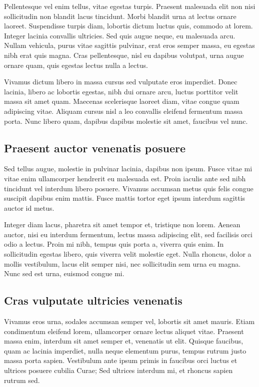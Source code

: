 Pellentesque vel enim tellus, vitae egestas turpis. Praesent malesuada elit
non nisi sollicitudin non blandit lacus tincidunt. Morbi blandit urna at
lectus ornare laoreet. Suspendisse turpis diam, lobortis dictum luctus
quis, commodo at lorem. Integer lacinia convallis ultricies. Sed quis augue
neque, eu malesuada arcu. Nullam vehicula, purus vitae sagittis pulvinar,
erat eros semper massa, eu egestas nibh erat quis magna. Cras pellentesque,
nisl eu dapibus volutpat, urna augue ornare quam, quis egestas lectus nulla
a lectus.

Vivamus dictum libero in massa cursus sed vulputate eros imperdiet. Donec
lacinia, libero ac lobortis egestas, nibh dui ornare arcu, luctus porttitor
velit massa sit amet quam. Maecenas scelerisque laoreet diam, vitae congue
quam adipiscing vitae. Aliquam cursus nisl a leo convallis eleifend
fermentum massa porta. Nunc libero quam, dapibus dapibus molestie sit amet,
faucibus vel nunc.

\subsection{Praesent auctor venenatis posuere}
Sed tellus augue, molestie in pulvinar lacinia, dapibus non ipsum. Fusce
vitae mi vitae enim ullamcorper hendrerit eu malesuada est. Proin iaculis
ante sed nibh tincidunt vel interdum libero posuere. Vivamus accumsan metus
quis felis congue suscipit dapibus enim mattis. Fusce mattis tortor eget
ipsum interdum sagittis auctor id metus.

Integer diam lacus, pharetra sit amet tempor et, tristique non lorem.
Aenean auctor, nisi eu interdum fermentum, lectus massa adipiscing elit,
sed facilisis orci odio a lectus. Proin mi nibh, tempus quis porta a,
viverra quis enim. In sollicitudin egestas libero, quis viverra velit
molestie eget. Nulla rhoncus, dolor a mollis vestibulum, lacus elit semper
nisi, nec sollicitudin sem urna eu magna. Nunc sed est urna, euismod congue
mi.

\subsection{Cras vulputate ultricies venenatis}
Vivamus eros urna, sodales accumsan semper vel, lobortis sit amet mauris.
Etiam condimentum eleifend lorem, ullamcorper ornare lectus aliquet vitae.
Praesent massa enim, interdum sit amet semper et, venenatis ut elit.
Quisque faucibus, quam ac lacinia imperdiet, nulla neque elementum purus,
tempus rutrum justo massa porta sapien. Vestibulum ante ipsum primis in
faucibus orci luctus et ultrices posuere cubilia Curae; Sed ultrices
interdum mi, et rhoncus sapien rutrum sed.

